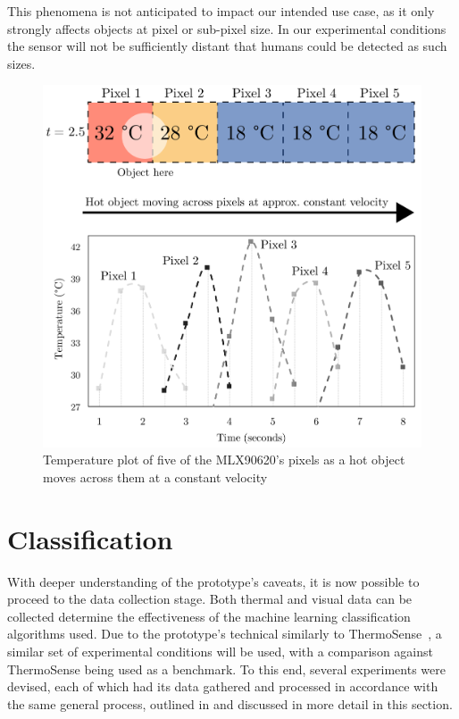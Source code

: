 \documentclass[../thesis/thesis.tex]{subfiles}
\begin{document}
This phenomena is not anticipated to impact our intended use case, as it only strongly affects objects at pixel or sub-pixel size. In our experimental conditions the sensor will not be sufficiently distant that humans could be detected as such sizes.

\begin{figure}
\centering
\includegraphics[width=\textwidth]{../diagrams/03_hot_water_top_row_modified2.pdf}
\caption{Temperature plot of five of the MLX90620's pixels as a hot object moves across them at a constant velocity}
\label{fig:hotmotion}
\end{figure}

\clearpage{}

\section{Classification}
With deeper understanding of the prototype's caveats, it is now possible to proceed to the data collection stage. Both thermal and visual data can be collected determine the effectiveness of the machine learning classification algorithms used. Due to the prototype's technical similarly to ThermoSense~\cite{beltran2013thermosense}, a similar set of experimental conditions will be used, with a comparison against ThermoSense being used as a benchmark. To this end, several experiments were devised, each of which had its data gathered and processed in accordance with the same general process, outlined in  and discussed in more detail in this section.
\end{document}
